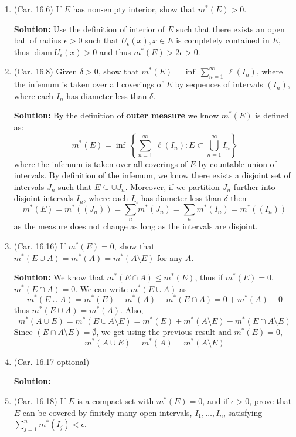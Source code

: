 \documentclass{article}
\def\le{\leqslant}
\def\diam{\operatorname{diam}}
\begin{document}
\begin{enumerate}
\item (Car. 16.6) If $E$ has non-empty interior, show that $m^*(E)>0$.

\textbf{Solution:} Use the definition of interior of $E$ such that
there exists an open ball of radius $\epsilon>0$ such that 
$U_\epsilon(x), x\in E$ is completely contained in $E$, thus 
$\diam U_\epsilon(x)>0$ and thus $m^*(E)>2\epsilon>0$.

\item (Car. 16.8) Given $\delta>0$, show that $m^*(E) = \inf 
\ \sum_{n=1}^\infty\ \ell(I_n)$, where the infemum is taken over
all coverings of $E$ by sequences of intervals $(I_n)$, where each
$I_n$ has diameter less than $\delta$.

\textbf{Solution:} By the definition of \textbf{outer measure}
we know $m^*(E)$ is defined as:
\[
m^*(E) = \inf\ \left\{ \sum_{n=1}^\infty \ \ell(I_n) : E \subset \bigcup_{n=1}^\infty I_n \right\}
\]
where the infemum is taken over all coverings of $E$ by countable union
of intervals. By definition of the infemum, we know there exists
a disjoint set of intervals $J_n$ such that $E \subseteq \cup J_n$. Moreover,
if we partition $J_n$ further into disjoint intervals $I_n$,
where each
$I_n$ has diameter less than $\delta$ then 
\[
m^*(E) = m^*((J_n)) = \sum_n m^*(J_n) = \sum_n m^*(I_n) = m^*((I_n))
\]
as the measure does not change as long as the intervals are disjoint.

\item (Car. 16.16) If $m^*(E)=0$, show that $m^*(E\cup A) = m^*(A) = m^*(A\setminus E)$ for any $A$. 

\textbf{Solution:} We know that $m^*(E\cap A) \le m^*(E)$, thus if 
$m^*(E)=0$, $m^*(E\cap A)=0$. We can write $m^*(E\cup A)$ as
\[
m^*(E\cup A) = m^*(E) + m^*(A) - m^*(E\cap A) = 0 + m^*(A) - 0
\]
thus $m^*(E\cup A) = m^*(A)$. Also,
\[
m^*(A\cup E) = m^*(E \cup A\setminus E ) = m^*(E) + m^*(A\setminus E) - m^*(E \cap A\setminus E)
\]
Since $(E \cap A\setminus E)=\emptyset$, we get using the previous result
and $m^*(E)=0$,
\[
m^*(A\cup E) = m^*(A) = m^*(A\setminus E)
\]

\item (Car. 16.17-optional)

\textbf{Solution:} 

\item (Car. 16.18) If $E$ is a compact set with $m^*(E)=0$, and if $\epsilon>0$, prove that
  $E$ can be covered by finitely many open intervals, $I_1,\ldots,I_n$, satisfying $\sum_{j=1}^n m^*(I_j) < \epsilon$.


\end{enumerate}
\end{document}
